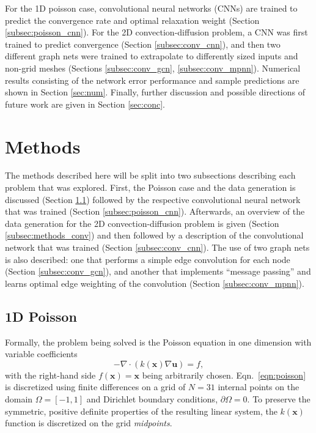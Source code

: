 \documentclass[review]{siamart190516}
\renewcommand{\vec}[1]{\bm{{#1}}}
\newcommand{\grad}{\nabla}
\begin{document}
For the 1D poisson case, convolutional neural networks (CNNs) are trained to predict the convergence rate and optimal relaxation weight (Section \ref{subsec:poisson_cnn}).  For the 2D convection-diffusion problem, a CNN was first trained to predict convergence (Section \ref{subsec:conv_cnn}), and then two different graph nets were trained to extrapolate to differently sized inputs and non-grid meshes (Sections \ref{subsec:conv_gcn}, \ref{subsec:conv_mpnn}).  Numerical results consisting of the network error performance and sample predictions are shown in Section \ref{sec:num}.  Finally, further discussion and possible directions of future work are given in Section \ref{sec:conc}.

\section{Methods}\label{sec:methods}

The methods described here will be split into two subsections describing each problem that was explored. First, the Poisson case and the data generation is discussed (Section \ref{subsec:methods_poisson}) followed by the respective convolutional neural network that was trained (Section \ref{subsec:poisson_cnn}).  Afterwards, an overview of the data generation for the 2D convection-diffusion problem is given (Section \ref{subsec:methods_conv}) and then followed by a description of the convolutional network that was trained (Section \ref{subsec:conv_cnn}).  The use of two graph nets is also described: one that performs a simple edge convolution for each node (Section \ref{subsec:conv_gcn}), and another that implements ``message passing'' and learns optimal edge weighting of the convolution (Section \ref{subsec:conv_mpnn}).

\subsection{1D Poisson}\label{subsec:methods_poisson}

Formally, the problem being solved is the Poisson equation in one dimension with variable coefficients
%
\begin{equation} \label{eqn:poisson}
  -\grad \cdot \left(k\left(\vec{x}\right) \grad\vec{u}\right) = f,
\end{equation}
%
with the right-hand side $f\left(\vec{x}\right)=\vec{x}$ being arbitrarily chosen.  Eqn.~\eqref{eqn:poisson} is discretized using finite differences on a grid of $N=31$ internal points on the domain $\Omega = \left[-1, 1\right]$ and Dirichlet boundary conditions, $\partial\Omega = 0$.  To preserve the symmetric, positive definite properties of the resulting linear system, the $k\left(\vec{x}\right)$ function is discretized on the grid \textit{midpoints}\cite{numpde}.
\end{document}
